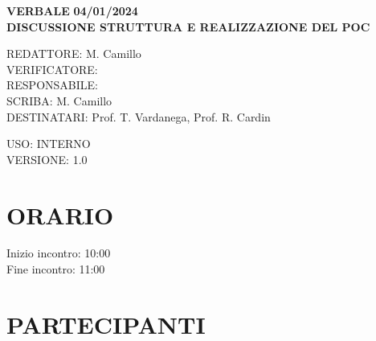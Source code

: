 \documentclass[5pt]{article}
\begin{document}
	\vspace{20pt}

	\begin{center}
		\textbf{\large VERBALE }
		\textbf{\large 04/01/2024} \\
		\textbf{\LARGE DISCUSSIONE STRUTTURA E REALIZZAZIONE DEL POC}
	\end{center}

	\vspace{13pt}

	\begin{flushleft}
		\begin{spacing}{1.5}
			REDATTORE: M. Camillo\\%
			VERIFICATORE: \\%
			RESPONSABILE: \\%
			\vspace{7pt}
			SCRIBA: M. Camillo\\%
			\vspace{7pt}
			DESTINATARI:   Prof. T. Vardanega, Prof. R. Cardin\\%
		\end{spacing}
	\end{flushleft}

	\begin{flushright}
		\begin{spacing}{1}
			USO: INTERNO\\
			VERSIONE: 1.0\\
		\end{spacing}
	\end{flushright}


	\restoregeometry

	\pagebreak


	\section{ORARIO}
	\begin{spacing}{1.5}
		{\large Inizio incontro: 10:00}\\
		{\large Fine incontro: 11:00}
	\end{spacing}

	\section{PARTECIPANTI}
	\setlength\cellspacetoplimit{6pt}
	\setlength\cellspacebottomlimit{6pt}
\end{document}
